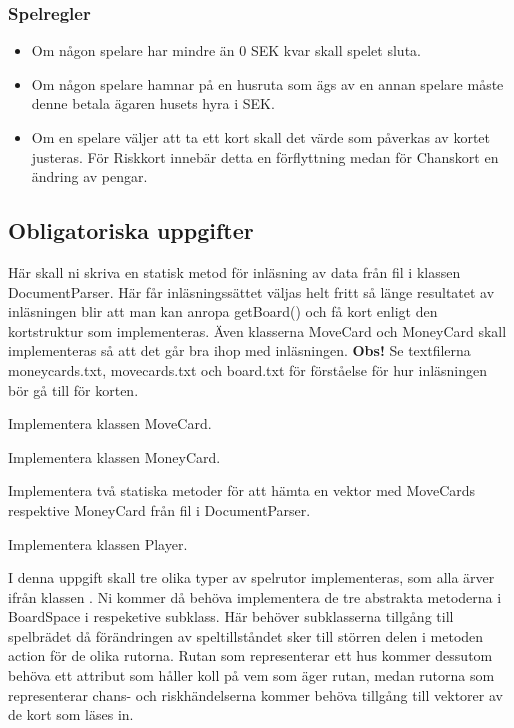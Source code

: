 \subsubsection{Spelregler}

\begin{itemize}
\item Om någon spelare har mindre än 0 SEK kvar skall spelet sluta.
\item Om någon spelare hamnar på en husruta som ägs av en annan spelare måste denne betala ägaren husets hyra i SEK.
\item Om en spelare väljer att ta ett kort skall det värde som påverkas av kortet justeras. För Riskkort innebär detta en förflyttning medan för Chanskort en ändring av pengar.

\end{itemize}



\subsection{Obligatoriska uppgifter}

\Task Här skall ni skriva en statisk metod för inläsning av data från fil i klassen DocumentParser. Här får inläsningssättet väljas helt fritt så länge resultatet av inläsningen blir att man kan anropa getBoard() och få kort enligt den kortstruktur som implementeras. Även klasserna MoveCard och MoneyCard skall implementeras så att det går bra ihop med inläsningen.
\newline
\newline
\noindent
\textbf{Obs!} Se textfilerna moneycards.txt, movecards.txt och board.txt för förståelse för hur inläsningen bör gå till för korten. 

\Subtask Implementera klassen MoveCard.

\Subtask Implementera klassen MoneyCard.

\Subtask Implementera två statiska metoder för att hämta en vektor med MoveCards respektive MoneyCard från fil i DocumentParser.

\Subtask Implementera klassen Player.

\Task I denna uppgift skall tre olika typer av spelrutor implementeras, som alla ärver ifrån klassen . Ni kommer då behöva implementera de tre abstrakta metoderna i BoardSpace i respeketive subklass. Här behöver subklasserna tillgång till spelbrädet då förändringen av speltillståndet sker till störren delen i metoden action för de olika rutorna. Rutan som representerar ett hus kommer dessutom behöva ett attribut som håller koll på vem som äger rutan, medan rutorna som representerar chans- och riskhändelserna kommer behöva tillgång till vektorer av de kort som läses in.


